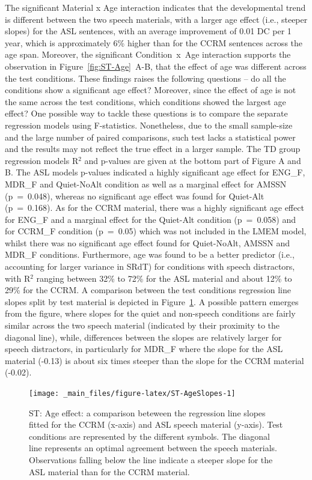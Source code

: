 \documentclass[a4paper, twoside]{templates/ociamthesis}
\begin{document}
The significant Material x Age interaction indicates that the developmental trend is different between the two speech materials, with a larger age effect (i.e., steeper slopes) for the ASL sentences, with an average improvement of 0.01 DC per 1 year, which is approximately 6\% higher than for the CCRM sentences across the age span. Moreover, the significant Condition~x~Age interaction supports the observation in Figure~\ref{fig:ST-Age}~A-B, that the effect of age was different across the test conditions. These findings raises the following questions -- do all the conditions show a significant age effect? Moreover, since the effect of age is not the same across the test conditions, which conditions showed the largest age effect? One possible way to tackle these questions is to compare the separate regression models using F-statistics. Nonetheless, due to the small sample-size and the large number of paired comparisons, such test lacks a statistical power and the results may not reflect the true effect in a larger sample. The TD group regression models R\(^{2}\) and p-values are given at the bottom part of Figure A and B. The ASL models p-values indicated a highly significant age effect for ENG\_F, MDR\_F and Quiet-NoAlt condition as well as a marginal effect for AMSSN (p~=~0.048), whereas no significant age effect was found for Quiet-Alt (p~=~0.168). As for the CCRM material, there was a highly significant age effect for ENG\_F and a marginal effect for the Quiet-Alt condition (p~=~0.058) and for CCRM\_F condition (p~=~0.05) which was not included in the LMEM model, whilst there was no significant age effect found for Quiet-NoAlt, AMSSN and MDR\_F conditions. Furthermore, age was found to be a better predictor (i.e., accounting for larger variance in SRdT) for conditions with speech distractors, with R\(^{2}\) ranging between 32\% to 72\% for the ASL material and about 12\% to 29\% for the CCRM. A comparison between the test conditions regression line slopes split by test material is depicted in Figure~\ref{fig:ST-AgeSlopes}. A possible pattern emerges from the figure, where slopes for the quiet and non-speech conditions are fairly similar across the two speech material (indicated by their proximity to the diagonal line), while, differences between the slopes are relatively larger for speech distractors, in particularly for MDR\_F where the slope for the ASL material (-0.13) is about six times steeper than the slope for the CCRM material (-0.02).\\

\begin{figure}

{\centering \texttt{[image: \_main\_files/figure-latex/ST-AgeSlopes-1]} 

}

\caption{ST: Age effect: a comparison beteween the regression line slopes fitted for the CCRM (x-axis) and ASL speech material (y-axis). Test conditions are represented by the different symbols. The diagonal line represents an optimal agreement between the speech materials. Observations falling below the line indicate a steeper slope for the ASL material than for the CCRM material.}\label{fig:ST-AgeSlopes}
\end{figure}
\end{document}
